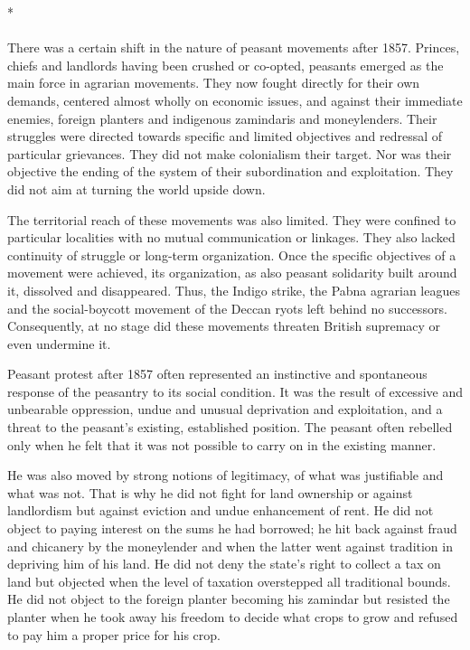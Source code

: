 \begin{center}*\end{center}

\paragraph*{}
There was a certain shift in the nature of peasant movements after 1857. Princes, chiefs and landlords having been crushed or co-opted, peasants emerged as the main force in agrarian movements. They now fought directly for their own demands, centered almost wholly on economic issues, and against their immediate enemies, foreign planters and indigenous zamindaris and moneylenders. Their struggles were directed towards specific and limited objectives and redressal of particular grievances. They did not make colonialism their target. Nor was their objective the ending of the system of their subordination and exploitation. They did not aim at turning the world upside down.

The territorial reach of these movements was also limited. They were confined to particular localities with no mutual communication or linkages. They also lacked continuity of struggle or long-term organization. Once the specific objectives of a movement were achieved, its organization, as also peasant solidarity built around it, dissolved and disappeared. Thus, the Indigo strike, the Pabna agrarian leagues and the social-boycott movement of the Deccan ryots left behind no successors. Consequently, at no stage did these movements threaten British supremacy or even undermine it.

Peasant protest after 1857 often represented an instinctive and spontaneous response of the peasantry to its social condition. It was the result of excessive and unbearable oppression, undue and unusual deprivation and exploitation, and a threat to the peasant's existing, established position. The peasant often rebelled only when he felt that it was not possible to carry on in the existing manner.

He was also moved by strong notions of legitimacy, of what was justifiable and what was not. That is why he did not fight for land ownership or against landlordism but against eviction and undue enhancement of rent. He did not object to paying interest on the sums he had borrowed; he hit back against fraud and chicanery by the moneylender and when the latter went against tradition in depriving him of his land. He did not deny the state's right to collect a tax on land but objected when the level of taxation overstepped all traditional bounds. He did not object to the foreign planter becoming his zamindar but resisted the planter when he took away his freedom to decide what crops to grow and refused to pay him a proper price for his crop.

